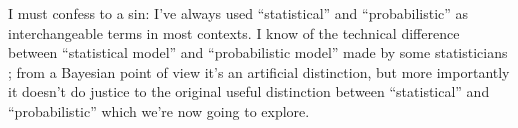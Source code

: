\documentclass[\ifafour a4paper,12pt,\else a5paper,10pt,\fi%
onecolumn,oneside,article,%
british%
]{memoir}
\title{\propertitle}
\author{%
\hspace*{\stretch{1}}%
\parbox{0.5\linewidth}%
{\protect\centering P.G.L.  Porta Mana\\%
\footnotesize\epost{\email{piero.mana}{ntnu.no}}}%
\hspace*{\stretch{1}}%
}
\date{Draft of \today\ (first drafted \firstdraft)}
\theoremstyle{remark}
\theoremstyle{innote}
\newcommand*{\citep}{\parencites}
\newcommand*{\amp}{\&}
\newcommand*{\asudedication}[1]{%
{\par\centering\textit{#1}\par}}
\renewcommand*{\|}{\nonscript\,\vert\nonscript\;\mathopen{}}
\begin{document}
\captiondelim{\quad}\captionnamefont{\footnotesize}\captiontitlefont{\footnotesize}
\frenchspacing
\maketitle

\abstractrunin
\abslabeldelim{}
\renewcommand*{\abstractname}{}
\setlength{\absleftindent}{0pt}
\setlength{\absrightindent}{0pt}
\setlength{\abstitleskip}{-\absparindent}
\begin{abstract}%
  \noindent ***
\\\noindent\emph{\footnotesize Note: Dear Reader
    \amp\ Peer, this manuscript is being peer-reviewed by you. Thank you.}
\end{abstract}
\frenchspacing





\bigskip

I must confess to a sin: I've always used \enquote{statistical} and
\enquote{probabilistic} as interchangeable terms in most contexts. I know
of the technical difference between \enquote{statistical model} and
\enquote{probabilistic model} made by some statisticians
\citep{mccullagh2002}; from a Bayesian point of view it's an artificial
distinction, but more importantly it doesn't do justice to the original
useful distinction between \enquote{statistical} and
\enquote{probabilistic} which we're now going to explore.
\end{document}
